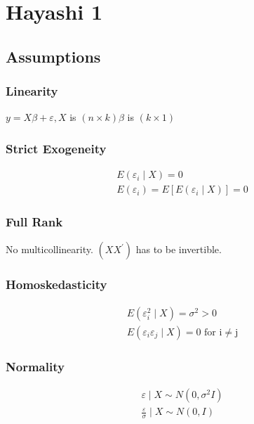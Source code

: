 \section{Hayashi 1}

\subsection{Assumptions}

\subsubsection{Linearity}

$y=X \beta+\varepsilon, X$ is $(n\times k) \beta$ is $(k\times1)$

\subsubsection{Strict Exogeneity}

\begin{align*}
    E\left(\varepsilon_i \mid X\right)=0 \\
    E\left(\varepsilon_i\right)=E\left[E\left(\varepsilon_i \mid X\right)\right]=0
\end{align*}

\subsubsection{Full Rank}

No multicollinearity. $(XX^\prime)$ has to be invertible.

\subsubsection{Homoskedasticity}

\begin{align*}
    E\left(\varepsilon_i^2 \mid X\right)=\sigma^2>0 \\
    E\left(\varepsilon_i \varepsilon_j \mid X\right)=0 \text { for } \mathrm{i} \neq \mathrm{j}
\end{align*}

\subsubsection{Normality}

\begin{align*}
    \varepsilon \mid X \sim N\left(0, \sigma^2 I\right) \\
    \frac{\varepsilon}{\sigma} \mid X \sim N(0, I)
\end{align*}

